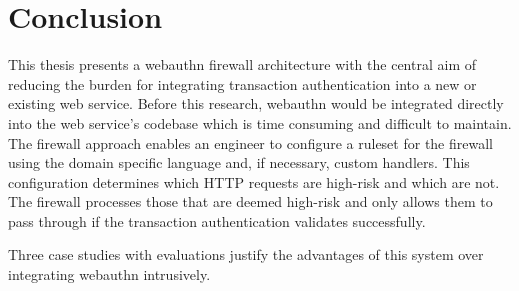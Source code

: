 
\chapter{Conclusion}\label{Chap:Conclusion}

This thesis presents a webauthn firewall architecture with the central aim of reducing the burden for integrating transaction authentication into a new or existing web service. Before this research, webauthn would be integrated directly into the web service's codebase which is time consuming and difficult to maintain. The firewall approach enables an engineer to configure a ruleset for the firewall using the domain specific language and, if necessary, custom handlers. This configuration determines which HTTP requests are high-risk and which are not. The firewall processes those that are deemed high-risk and only allows them to pass through if the transaction authentication validates successfully.

Three case studies with evaluations justify the advantages of this system over integrating webauthn intrusively.

